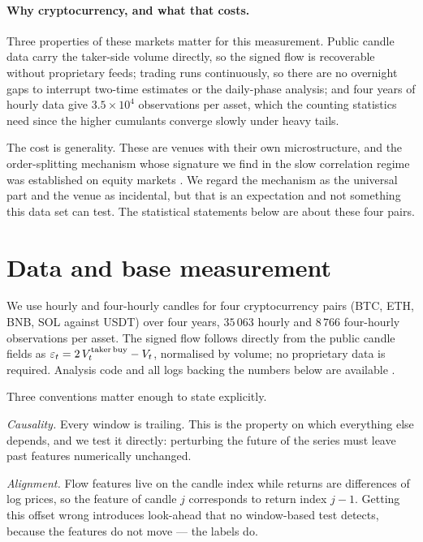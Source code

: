 \documentclass[aps,pre,twocolumn,superscriptaddress,floatfix,nofootinbib]{revtex4-2}
\newcommand{\eps}{\varepsilon}
\begin{document}
\paragraph*{Why cryptocurrency, and what that costs.}
Three properties of these markets matter for this measurement. Public candle
data carry the taker-side volume directly, so the signed flow is recoverable
without proprietary feeds; trading runs continuously, so there are no overnight
gaps to interrupt two-time estimates or the daily-phase analysis; and four years
of hourly data give $3.5\times10^{4}$ observations per asset, which the counting
statistics need since the higher cumulants converge slowly under heavy tails.

The cost is generality. These are venues with their own microstructure, and the
order-splitting mechanism whose signature we find in the slow correlation regime
was established on equity markets \cite{lillo2005,sato2023prl,sato2023prr}. We
regard the mechanism as the universal part and the venue as incidental, but that
is an expectation and not something this data set can test. The statistical
statements below are about these four pairs.

\section{Data and base measurement}
\label{sec:data}

We use hourly and four-hourly candles for four cryptocurrency pairs (BTC, ETH,
BNB, SOL against USDT) over four years, $35\,063$ hourly and $8\,766$
four-hourly observations per asset. The signed flow follows directly from the
public candle fields as $\eps_t = 2\,V^{\rm taker\,buy}_t - V_t$, normalised by
volume; no proprietary data is required. Analysis code and all logs backing the
numbers below are available \cite{code_keldysh_finance}.

Three conventions matter enough to state explicitly.

\emph{Causality.} Every window is trailing. This is the property on which
everything else depends, and we test it directly: perturbing the future of the
series must leave past features numerically unchanged.

\emph{Alignment.} Flow features live on the candle index while returns are
differences of log prices, so the feature of candle $j$ corresponds to return
index $j-1$. Getting this offset wrong introduces look-ahead that no
window-based test detects, because the features do not move --- the labels do.
\end{document}
